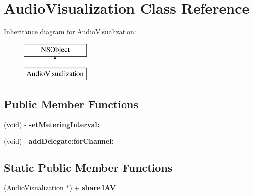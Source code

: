 \hypertarget{interface_audio_visualization}{\section{Audio\-Visualization Class Reference}
\label{interface_audio_visualization}
}
Inheritance diagram for Audio\-Visualization\-:\begin{figure}[H]
\begin{center}
\leavevmode
\includegraphics[height=2.000000cm]{interface_audio_visualization}
\end{center}
\end{figure}
\subsection*{Public Member Functions}
\begin{DoxyCompactItemize}
\item 
\hypertarget{interface_audio_visualization_a021dadee626680284d342e5e0a93698d}{(void) -\/ {\bfseries set\-Metering\-Interval\-:}}\label{interface_audio_visualization_a021dadee626680284d342e5e0a93698d}

\item 
\hypertarget{interface_audio_visualization_ab08dad4d895785fde37fae1fdcbdaca3}{(void) -\/ {\bfseries add\-Delegate\-:for\-Channel\-:}}\label{interface_audio_visualization_ab08dad4d895785fde37fae1fdcbdaca3}

\end{DoxyCompactItemize}
\subsection*{Static Public Member Functions}
\begin{DoxyCompactItemize}
\item 
\hypertarget{interface_audio_visualization_aabd63bd21827626823fc67d8d02a4e21}{(\hyperlink{interface_audio_visualization}{Audio\-Visualization} $\ast$) + {\bfseries shared\-A\-V}}\label{interface_audio_visualization_aabd63bd21827626823fc67d8d02a4e21}

\end{DoxyCompactItemize}
